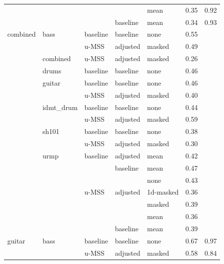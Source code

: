\begin{theappendices}
\begin{longtable}{lllllrr}
     &      &       &          & mean &            0.35 &                  0.92 \\
     &      &       & baseline & mean &            0.34 &                  0.93 \\
combined & bass & baseline & baseline & none &            0.55 &                       \\
     &      & u-MSS & adjusted & masked &            0.49 &                       \\
     & combined & u-MSS & adjusted & masked &            0.26 &                       \\
     & drums & baseline & baseline & none &            0.46 &                       \\
     & guitar & baseline & baseline & none &            0.46 &                       \\
     &      & u-MSS & adjusted & masked &            0.40 &                       \\
     & idmt\_drum & baseline & baseline & none &            0.44 &                       \\
     &      & u-MSS & adjusted & masked &            0.59 &                       \\
     & sh101 & baseline & baseline & none &            0.38 &                       \\
     &      & u-MSS & adjusted & masked &            0.30 &                       \\
     & urmp & baseline & adjusted & mean &            0.42 &                       \\
     &      &       & baseline & mean &            0.47 &                       \\
     &      &       &          & none &            0.43 &                       \\
     &      & u-MSS & adjusted & 1d-masked &            0.36 &                       \\
     &      &       &          & masked &            0.39 &                       \\
     &      &       &          & mean &            0.36 &                       \\
     &      &       & baseline & mean &            0.39 &                       \\
guitar & bass & baseline & baseline & none &            0.67 &                  0.97 \\
     &      & u-MSS & adjusted & masked &            0.58 &                  0.84 \\

\end{longtable}
\end{theappendices}
